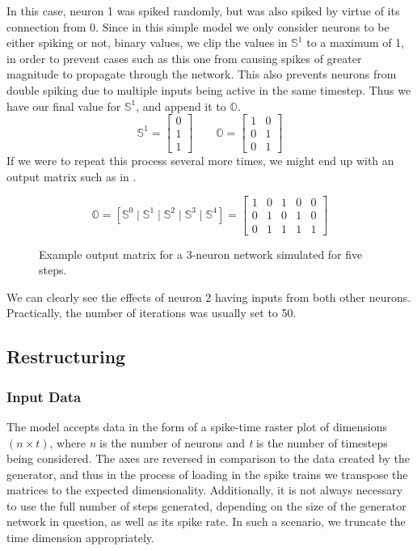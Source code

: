 In this case, neuron 1 was spiked randomly, but was also spiked by virtue of its 
connection from 0. Since in this simple model we only consider neurons to be 
either spiking or not, binary values, we clip the values in $\mathbb{S}^1$ to a 
maximum of 1, in order to prevent cases such as this one from causing spikes of 
greater magnitude to propagate through the network. This also prevents neurons 
from double spiking due to multiple inputs being active in the same timestep. 
Thus we have our final value for $\mathbb{S}^1$, and append it to $\mathbb{O}$.
\[
	\mathbb{S}^1 = \begin{bmatrix} 0 \\ 1 \\ 1 \end{bmatrix} \qquad
	\mathbb{O} = \begin{bmatrix}
		1 & 0\\
		0 & 1\\
		0 & 1 \end{bmatrix}
\]
If we were to repeat this process several more times, we might end up with an 
output matrix such as in .
\begin{figure}[H]
\[
	\mathbb{O} = \left[ \mathbb{S}^0 \mid
		\mathbb{S}^1 \mid \mathbb{S}^2 \mid \mathbb{S}^3 \mid \mathbb{S}^4 
	\right] = \begin{bmatrix}
		1 & 0 & 1 & 0 & 0\\
		0 & 1 & 0 & 1 & 0\\
		0 & 1 & 1 & 1 & 1
	\end{bmatrix}
\]
\caption{Example output matrix for a 3-neuron network simulated for five steps.}
\label{fig:exoutput}
\end{figure}\noindent
We can clearly see the effects of neuron 2 having inputs from both other 
neurons. Practically, the number of iterations was usually set to 50.


\subsection{Restructuring}
\label{subsec:restructuring}

\subsubsection{Input Data}
The model accepts data in the form of a spike-time raster plot of dimensions $(n 
\times t)$, where \textit{n} is the number of neurons and \textit{t} is the 
number of timesteps being considered. The axes are reversed in comparison to the 
data created by the generator, and thus in the process of loading in the spike 
trains we transpose the matrices to the expected dimensionality. Additionally, 
it is not always necessary to use the full number of steps generated, depending 
on the size of the generator network in question, as well as its spike rate. In 
such a scenario, we truncate the time dimension appropriately.

